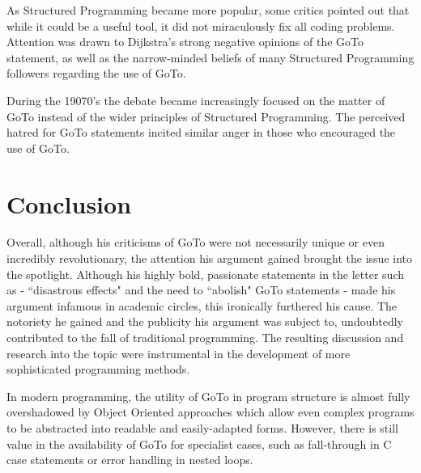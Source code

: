 \documentclass{scrartcl}
\begin{document}
As Structured Programming became more popular, some critics pointed out that while it could be a useful tool, it did not miraculously fix all coding problems. Attention was drawn to Dijkstra's strong negative opinions of the GoTo statement, as well as the narrow-minded beliefs of many Structured Programming followers regarding the use of GoTo. \cite{structuredharmful} 

During the 19070's the debate became increasingly focused on the matter of GoTo instead of the wider principles of Structured Programming. The perceived hatred for GoTo statements incited similar anger in those who encouraged the use of GoTo.

\section{Conclusion}


Overall, although his criticisms of GoTo were not necessarily unique or even incredibly revolutionary, the attention his argument gained brought the issue into the spotlight. Although his highly bold, passionate statements in the letter such as - ``disastrous effects" and the need to ``abolish" GoTo statements \cite[p. ~147]{dijkstragoto} -  made his argument infamous in academic circles, this ironically furthered his cause. The notoriety he gained and the publicity his argument was subject to, undoubtedly contributed to the fall of traditional programming. The resulting discussion and research into the topic were instrumental in the development of more sophisticated programming methods.

In modern programming, the utility of GoTo in program structure is almost fully overshadowed by Object Oriented approaches which allow even complex programs to be abstracted into readable and easily-adapted forms. However, there is still value in the availability of GoTo for specialist cases, such as fall-through in C case statements or error handling in nested loops. \cite{useofgoto}



\end{document}
